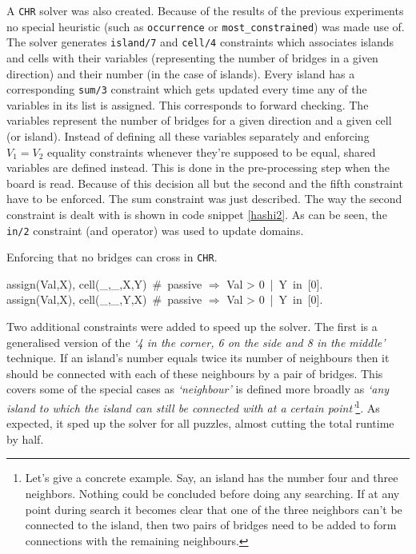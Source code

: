 A \texttt{CHR} solver was also created. Because of the results of the previous experiments no special heuristic (such as \texttt{occurrence} or \texttt{most\_constrained}) was made use of. The solver generates \texttt{island/7} and \texttt{cell/4} constraints which associates islands and cells with their variables (representing the number of bridges in a given direction) and their number (in the case of islands). Every island has a corresponding \texttt{sum/3} constraint which gets updated every time any of the variables in its list is assigned. This corresponds to forward checking. The variables represent the number of bridges for a given direction and a given cell (or island). Instead of defining all these variables separately and enforcing $V_1=V_2$ equality constraints whenever they're supposed to be equal, shared variables are defined instead. This is done in the pre-processing step when the board is read. Because of this decision all but the second and the fifth constraint have to be enforced. The sum constraint was just described. The way the second constraint is dealt with is shown in code snippet \ref{hashi2}. As can be seen, the \texttt{in/2} constraint (and operator) was used to update domains.

\begin{snippet}[H]
\caption{Enforcing that no bridges can cross in \texttt{CHR}.}\label{hashi2}
\small
assign(Val,X), cell(\_,\_,X,Y)\ \#\ passive $\Longrightarrow$ Val > 0\ |\ Y\ in\ [0].\\
assign(Val,X), cell(\_,\_,Y,X)\ \#\ passive $\Longrightarrow$ Val > 0\ |\ Y\ in\ [0].
\end{snippet}

Two additional constraints were added to speed up the solver. The first is a generalised version of the \textit{`4 in the corner, 6 on the side and 8 in the middle'} technique. If an island's number equals twice its number of neighbours then it should be connected with each of these neighbours by a pair of bridges. This covers some of the special cases as \textit{`neighbour'} is defined more broadly as  \textit{`any island to which the island can still be connected with at a certain point'}\footnote{Let's give a concrete example. Say, an island has the number four and three neighbors. Nothing could be concluded before doing any searching. If at any point during search it becomes clear that one of the three neighbors can't be connected to the island, then two pairs of bridges need to be added to form connections with the remaining neighbours.}. As expected, it sped up the solver for all puzzles, almost cutting the total runtime by half.\\\par

